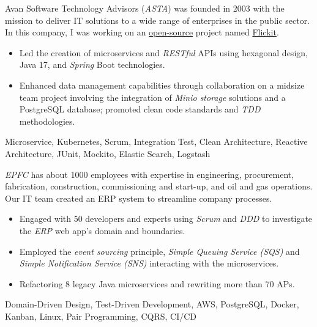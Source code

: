 \vspace*{-5pt}
\begin{experiences}
{
  Avan Software Technology Advisors (\emph{ASTA}) was founded in 2003 with the mission to deliver IT solutions to a wide range of enterprises in the public sector. In this company, I was working on an \href{https://github.com/flickit-platform/flickit-assessment}{open-source} project named \href{https://flickit.org/}{Flickit}.
  \begin{itemize}
    \item Led the creation of microservices and \emph{RESTful} APIs using hexagonal design, Java 17, and \emph{Spring} Boot technologies.
    \item Enhanced data management capabilities through collaboration on a midsize team project involving the integration of \emph{Minio storage} solutions and a PostgreSQL database; promoted clean code standards and \emph{TDD} methodologies. \end{itemize}}
  {Microservice, Kubernetes, Scrum, Integration Test, Clean Architecture, Reactive Architecture, JUnit, Mockito, Elastic Search, Logstash} 
 \emptySeparator
 {
   \emph{EPFC} has about 1000 employees with expertise in engineering, procurement, fabrication, construction, commissioning and start-up, and oil and gas operations. Our IT team created an ERP system to streamline company processes.
   \begin{itemize}
   \item Engaged with 50 developers and experts using \emph{Scrum} and \emph{DDD} to investigate the \textit{ERP} web app's domain and boundaries.
   \item Employed the \textit{event sourcing} principle, \textit{Simple Queuing Service (SQS)} and \textit{Simple Notification Service (SNS)} interacting with the microservices.
   \item Refactoring 8 legacy Java microservices and rewriting more than 70 APs.
   \end{itemize}}{Domain-Driven Design, Test-Driven Development, AWS, PostgreSQL, Docker, Kanban, Linux, Pair Programming, CQRS, CI/CD}

\end{experiences}
